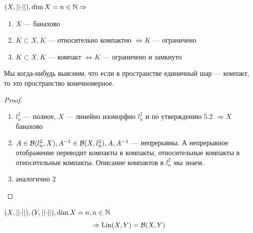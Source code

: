 \documentclass[document]{subfiles}
\begin{document}
\begin{corollary}
    $(X, \left|\left| {\cdot} \right| \right|), \dim X = n \in \mathbb{N} \Rightarrow$
    \begin{enumerate}
        \item $X$ --- банахово 
        \item $K \subset X, K$ --- относительно компактно $\Leftrightarrow K$ --- ограничено
        \item $K \subset X, K$ --- компакт $\Leftrightarrow K$ --- ограничено и замкнуто  
    \end{enumerate}
\end{corollary}
Мы когда-нибудь выясним, что если в пространстве единичный шар --- компакт, то это пространство конечномерное.
\begin{proof}
    \begin{enumerate}
        \item $l^2_n$ --- полное, $X$ --- линейно изоморфно $l^2_n$ и по утверждению 5.2 $\Rightarrow X$ банахово 
        \item $A \in \mathcal{B}(l^2_n, X), A^{-1} \in \mathcal{B}(X, l^2_n), A, A^{-1}$ --- непрерывны. А непрерывное отображение переводит компакты в компакты, относительные компакты в относительные компакты. Описание 
            компактов в $l^2_n$ мы знаем.
        \item аналогично 2
    \end{enumerate}
\end{proof}
 
\begin{theorem}
    $(X, \left|\left| {\cdot} \right| \right|), (Y, \left|\left| {\cdot} \right| \right|), \dim X = n, n \in \mathbb{N}$
    \[ \Rightarrow \operatorname{Lin}(X,Y) = \mathcal{B}(X,Y) \]
\end{theorem}
\end{document}
